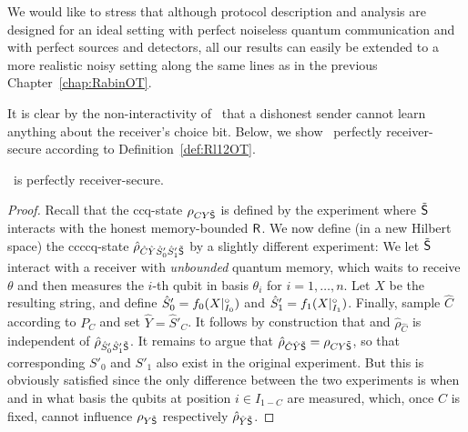 We would like to stress that although protocol description and
analysis are designed for an ideal setting with perfect noiseless
quantum communication and with perfect sources and detectors, all our
results can easily be extended to a more realistic noisy setting along the
same lines as in the previous Chapter~\ref{chap:RabinOT}.

It is clear by the non-interactivity of \Randlqot\ that a
dishonest sender cannot learn anything about the receiver's choice
bit. Below, we show \Randlqot\ perfectly receiver-secure
according to Definition~\ref{def:Rl12OT}.
\begin{proposition}\label{prop:sec:oblivious}
\Randlqot\ is perfectly receiver-secure.
\end{proposition}
\begin{proof}
  Recall that the ccq-state $\rho_{C Y \tilde{\sf S}}$ is defined by the experiment
  where $\tilde{\sf S}$ interacts with the honest memory-bounded ${\sf R}$. We now
  define (in a new Hilbert space) the ccccq-state $\hat{\rho}_{\hat{C}
    \hat{Y} \hat{S}'_0 \hat{S}'_1 \tilde{\sf S}}$ by a slightly different
  experiment: We let $\tilde{\sf S}$ interact with a receiver with {\em
    unbounded} quantum memory, which waits to receive $\theta$ and
  then measures the $i$-th qubit in basis $\theta_i$ for
  $i=1,\ldots,n$. Let $X$ be the resulting string, and define
  $\hat{S}'_0 = f_0(X |^{\circ}_{I_0})$ and $\hat{S}'_1 = f_1(X
  |^{\circ}_{I_1})$.  Finally, sample $\hat{C}$ according to $P_C$ and set
  $\hat{Y} = \hat{S}'_C$.  It follows by construction that
   and
  $\hat{\rho}_{\hat{C}}$ is independent of $\hat{\rho}_{\hat{S}'_0
      \hat{S}'_1 \tilde{\sf S}}$.  It remains to argue that $\hat{\rho}_{\hat{C}
      \hat{Y} \tilde{\sf S}} = \rho_{C Y \tilde{\sf S}}$, so that corresponding $S'_0$ and
    $S'_1$ also exist in the original experiment. But this is
    obviously satisfied since the only difference between the two
    experiments is when and in what basis the qubits at position $i
    \in I_{1-C}$ are measured, which, once $C$ is fixed, cannot
    influence $\rho_{Y \tilde{\sf S}}$ respectively $\hat{\rho}_{\hat{Y} \tilde{\sf S}}$.
\end{proof}


